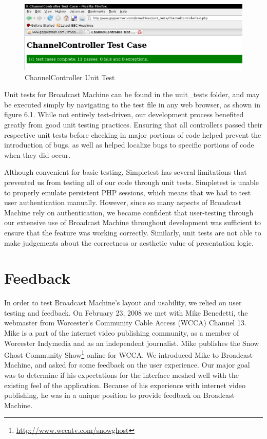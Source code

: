 \documentclass[a4paper,12pt]{report}
\begin{document}
\begin{figure}[h]
\begin{center}
\includegraphics[scale=0.45]{./images/unittest.png}
\end{center}
\caption{ChannelController Unit Test}
\end{figure}

Unit tests for Broadcast Machine can be found in the unit\_tests folder, and may be executed simply by navigating to the test file in any web browser, as shown in figure 6.1. While not entirely test-driven, our development process benefited greatly from good unit testing practices. Ensuring that all controllers passed their respective unit tests before checking in major portions of code helped prevent the introduction of bugs, as well as helped localize bugs to specific portions of code when they did occur. 

Although convenient for basic testing, Simpletest has several limitations that prevented us from testing all of our code through unit tests. Simpletest is unable to properly emulate persistent PHP sessions, which means that we had to test user authentication manually. However, since so many aspects of Broadcast Machine rely on authentication, we became confident that user-testing through our extensive use of Broadcast Machine throughout development was sufficient to ensure that the feature was working correctly. Similarly, unit tests are not able to make judgements about the correctness or aesthetic value of presentation logic. 

\section{Feedback}

In order to test Broadcast Machine's layout and usability, we relied on user testing and feedback. On February 23, 2008 we met with Mike Benedetti, the webmaster from Worcester's Community Cable Access (WCCA) Channel 
13. Mike is a part of the internet video publishing community, as a member of Worcester Indymedia and as an independent journalist. Mike publishes the Snow Ghost Community Show\footnote{\url{http://www.wccatv.com/snowghost}} online for WCCA.
We introduced Mike to Broadcast Machine, and asked for some feedback on the user experience.
Our major goal was to determine if his expectations for the interface meshed well with the existing feel of the application.
Because of his experience with internet video publishing, he was in a unique position to provide feedback on Broadcast Machine.
\end{document}
